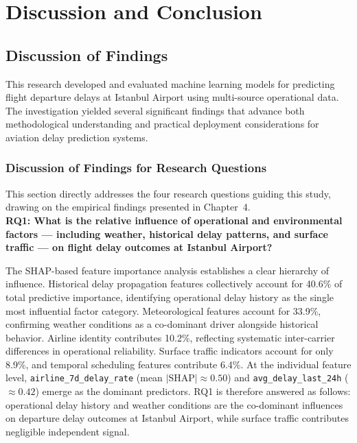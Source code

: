 \documentclass{report}
\begin{document}
  




    
   
   















\chapter{Discussion and Conclusion}
\label{ch:discussion}

\section{Discussion of Findings}
\label{sec:discussion_findings}

This research developed and evaluated machine learning models for predicting flight departure delays at Istanbul Airport using multi-source operational data. The investigation yielded several significant findings that advance both methodological understanding and practical deployment considerations for aviation delay prediction systems.


\subsection{Discussion of Findings for Research Questions}

This section directly addresses the four research questions guiding this study, drawing on the
empirical findings presented in Chapter~4. \\

\textbf{RQ1: What is the relative influence of operational and environmental factors ---
including weather, historical delay patterns, and surface traffic --- on flight delay outcomes
at Istanbul Airport?}

The SHAP-based feature importance analysis establishes a clear hierarchy of influence. Historical
delay propagation features collectively account for 40.6\% of total predictive importance,
identifying operational delay history as the single most influential factor category.
Meteorological features account for 33.9\%, confirming weather conditions as a co-dominant
driver alongside historical behavior. Airline identity contributes 10.2\%, reflecting
systematic inter-carrier differences in operational reliability. Surface traffic indicators
account for only 8.9\%, and temporal scheduling features contribute 6.4\%. At the individual
feature level, \texttt{airline\_7d\_delay\_rate} (mean $|\text{SHAP}| \approx 0.50$) and
\texttt{avg\_delay\_last\_24h} ($\approx 0.42$) emerge as the dominant predictors. RQ1 is
therefore answered as follows: operational delay history and weather conditions are the
co-dominant influences on departure delay outcomes at Istanbul Airport, while surface traffic
contributes negligible independent signal. \\
\end{document}
